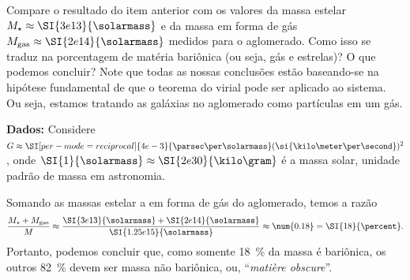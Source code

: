 \documentclass[]{IMTexam}
\begin{document}
\begin{questions}
\begin{unindent}[start=0]
		\item Compare o resultado do item anterior com os valores da massa estelar $ M_{\star}\approx \SI{3e13}{\solarmass} $ e da massa em forma de gás $ M_{\text{gas}}\approx \SI{2e14}{\solarmass} $ medidos para o aglomerado. Como isso se traduz na porcentagem de matéria bariônica (ou seja, gás e estrelas)? O que podemos concluir? Note que todas as nossas conclusões estão baseando-se na hipótese fundamental de que o teorema do virial pode ser aplicado ao sistema. Ou seja, estamos tratando as galáxias no aglomerado como partículas em um gás.

		\textbf{Dados:} Considere $ G\approx \SI[per-mode=reciprocal]{4e-3}{\parsec\per\solarmass}(\si{\kilo\meter\per\second})^{2} $, onde $ \SI{1}{\solarmass}\approx \SI{2e30}{\kilo\gram} $ é a massa solar, unidade padrão de massa em astronomia.

		\begin{solution}
			Somando as massas estelar a em forma de gás do aglomerado, temos a razão
			\[ \dfrac{M_\star+M_{\textup{gas}}}{M}\approx\dfrac{\SI{3e13}{\solarmass}+\SI{2e14}{\solarmass}}{\SI{1.25e15}{\solarmass}}\approx \num{0.18}=\SI{18}{\percent}. \]
			Portanto, podemos concluir que, como somente \SI{18}{\percent} da massa é bariônica, os outros \SI{82}{\percent} devem ser massa não bariônica, ou, ``\textit{matière obscure}''.
		\end{solution}

	\end{unindent}
\end{questions}
\end{document}
